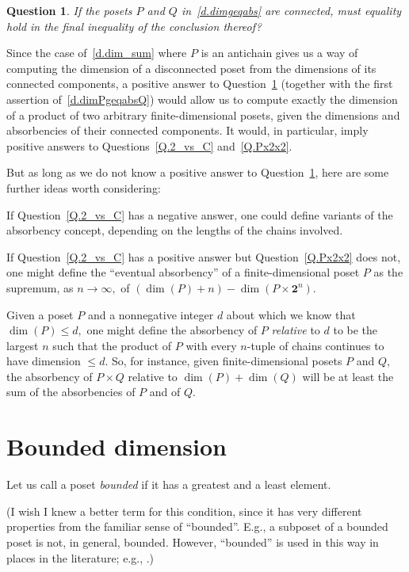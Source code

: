 \documentclass{amsart}
\newtheorem{question}[theorem]{Question}
\numberwithin{equation}{section}
\numberwithin{theorem}{section}
\newcommand{\2}{\mathbf{2}}
\begin{document}
\begin{question}\label{Q.cnnctd}
If the posets $P$ and $Q$ in~\eqref{d.dimgeqabs}
are connected, must equality
hold in the final inequality of the conclusion thereof?
\end{question}

Since the case of~\eqref{d.dim_sum} where $P$ is an antichain
gives us a way of computing the
dimension of a disconnected poset from the dimensions of its
connected components, a positive answer to
Question~\ref{Q.cnnctd} (together with the
first assertion of~\eqref{d.dimPgeqabsQ}) would
allow us to compute exactly the dimension of a product of
two arbitrary finite-dimensional posets, given the dimensions and
absorbencies of their connected components.
It would, in particular, imply positive answers to
Questions~\ref{Q.2_vs_C} and~\ref{Q.Px2x2}.

But as long as we do
not know a positive answer to Question~\ref{Q.cnnctd},
here are some further ideas worth considering:

If Question~\ref{Q.2_vs_C} has a negative answer, one could
define variants of the absorbency concept, depending on
the lengths of the chains involved.

If Question~\ref{Q.2_vs_C} has a positive answer
but Question~\ref{Q.Px2x2} does not,
one might define the ``eventual absorbency''
of a finite-dimensional poset $P$ as the supremum, as
$n\to\infty,$ of $(\dim(P) + n) - \dim(P\times \2^n).$

Given a poset $P$ and a nonnegative integer
$d$ about which we know that $\dim(P)\leq d,$ one might define
the absorbency of $P$ {\em relative} to $d$ to
be the largest $n$ such that the product of $P$ with every
$\!n\!$-tuple of chains continues to have dimension $\leq d.$
So, for instance, given finite-dimensional posets $P$ and $Q,$
the absorbency of $P\times Q$ relative to $\dim(P)+\dim(Q)$
will be at least the sum of the absorbencies of $P$ and of $Q.$

\section{Bounded dimension}\label{S.bd-dim}

Let us call a poset {\em bounded} if it has a greatest
and a least element.

(I wish I knew a better term for
this condition, since it has very different properties from
the familiar sense of ``bounded''.
E.g., a subposet of a bounded poset is not, in general, bounded.
However, ``bounded'' is used in this way in places in the literature;
e.g., \cite[p.179, 12th line from bottom]{K+T}.)
\end{document}
